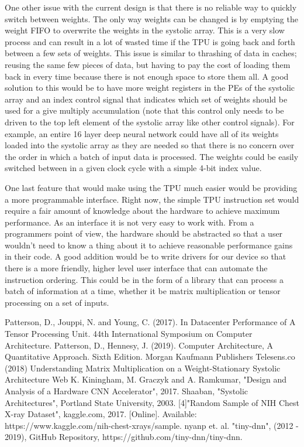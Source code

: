 \documentclass[11pt, conference, onecolumn]{IEEEtran}
\begin{document}
    One other issue with the current design is that there is no reliable way to quickly
    switch between weights. The only way weights can be changed is by emptying the weight
    FIFO to overwrite the weights in the systolic array. This is a very slow process and
    can result in a lot of wasted time if the TPU is going back and forth between a few
    sets of weights. This issue is similar to thrashing of data in caches; reusing the
    same few pieces of data, but having to pay the cost of loading them back in every time
    because there is not enough space to store them all. A good solution to this would be
    to have more weight registers in the PEs of the systolic array and an index control
    signal that indicates which set of weights should be used for a give multiply
    accumulation (note that this control only needs to be driven to the top left element
    of the systolic array like other control signals). For example, an entire 16 layer
    deep neural network could have all of its weights loaded into the systolic array as
    they are needed so that there is no concern over the order in which a batch of input
    data is processed. The weights could be easily switched between in a given clock cycle
    with a simple 4-bit index value.

    One last feature that would make using the TPU much easier would be providing a more
    programmable interface. Right now, the simple TPU instruction set would require a fair
    amount of knowledge about the hardware to achieve maximum performance. As an interface
    it is not very easy to work with. From a programmers point of view, the hardware
    should be abstracted so that a user wouldn’t need to know a thing about it to achieve
    reasonable performance gains in their code. A good addition would be to write drivers
    for our device so that there is a more friendly, higher level user interface that can
    automate the instruction ordering. This could be in the form of a library that can
    process a batch of information at a time, whether it be matrix multiplication or
    tensor processing on a set of inputs.

\begin{thebibliography}{00}
 Patterson, D., Jouppi, N. and Young, C. (2017). In Datacenter Performance of A Tensor Processing Unit. 44th International Symposium on Computer Architecture.
 Patterson, D., Hennesy, J. (2019). Computer Architecture, A Quantitative Approach. Sixth Edition. Morgan Kaufmann Publishers
 Telesens.co (2018) Understanding Matrix Multiplication on a Weight-Stationary Systolic Architecture Web
 K. Kiningham, M. Graczyk and A. Ramkumar, "Design and Analysis of a Hardware CNN Accelerator", 2017.
 Shaaban, "Systolic Architectures", Portland State University, 2003.
 [4]"Random Sample of NIH Chest X-ray Dataset", kaggle.com, 2017. [Online]. Available: https://www.kaggle.com/nih-chest-xrays/sample.
 nyanp et. al. "tiny-dnn", (2012 - 2019), GitHub Repository, https://github.com/tiny-dnn/tiny-dnn.
\end{thebibliography}
\end{document}
